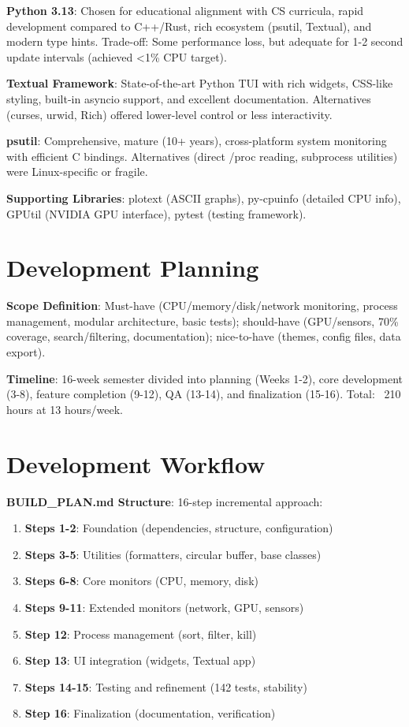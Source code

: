 \documentclass[12pt,a4paper,oneside]{report}
\begin{document}
\textbf{Python 3.13}: Chosen for educational alignment with CS curricula, rapid development compared to C++/Rust, rich ecosystem (psutil, Textual), and modern type hints. Trade-off: Some performance loss, but adequate for 1-2 second update intervals (achieved <1\% CPU target).

\textbf{Textual Framework}: State-of-the-art Python TUI with rich widgets, CSS-like styling, built-in asyncio support, and excellent documentation. Alternatives (curses, urwid, Rich) offered lower-level control or less interactivity.

\textbf{psutil}: Comprehensive, mature (10+ years), cross-platform system monitoring with efficient C bindings. Alternatives (direct /proc reading, subprocess utilities) were Linux-specific or fragile.

\textbf{Supporting Libraries}: plotext (ASCII graphs), py-cpuinfo (detailed CPU info), GPUtil (NVIDIA GPU interface), pytest (testing framework).

\section{Development Planning}
\label{sec:development-planning}

\textbf{Scope Definition}: Must-have (CPU/memory/disk/network monitoring, process management, modular architecture, basic tests); should-have (GPU/sensors, 70\% coverage, search/filtering, documentation); nice-to-have (themes, config files, data export).

\textbf{Timeline}: 16-week semester divided into planning (Weeks 1-2), core development (3-8), feature completion (9-12), QA (13-14), and finalization (15-16). Total: ~210 hours at 13 hours/week.

\section{Development Workflow}
\label{sec:development-workflow}

\textbf{BUILD\_PLAN.md Structure}: 16-step incremental approach:
\begin{enumerate}
    \item \textbf{Steps 1-2}: Foundation (dependencies, structure, configuration)
    \item \textbf{Steps 3-5}: Utilities (formatters, circular buffer, base classes)
    \item \textbf{Steps 6-8}: Core monitors (CPU, memory, disk)
    \item \textbf{Steps 9-11}: Extended monitors (network, GPU, sensors)
    \item \textbf{Step 12}: Process management (sort, filter, kill)
    \item \textbf{Step 13}: UI integration (widgets, Textual app)
    \item \textbf{Steps 14-15}: Testing and refinement (142 tests, stability)
    \item \textbf{Step 16}: Finalization (documentation, verification)
\end{enumerate}
\end{document}
